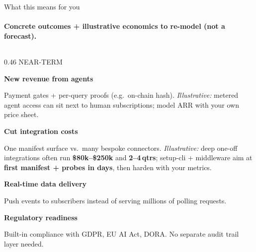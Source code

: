 \documentclass[aspectratio=169,10pt]{beamer}
\begin{document}
\begin{frame}[shrink=8]{What this means for you}
\framesubtitle{Concrete outcomes + \textbf{illustrative} economics to re-model (not a forecast).}

\vspace{0.06cm}

\begin{columns}[T]
\begin{column}{0.46\textwidth}
{\footnotesize\color{mint} NEAR-TERM}\par
\vspace{4pt}
{\footnotesize\color{txtm}%
\textbf{New revenue from agents}\par
{\color{slate} Payment gates + per-query proofs (e.g.\ on-chain hash). \textit{Illustrative:} metered agent access can sit next to human subscriptions; model ARR with your own price sheet.}\par
\vspace{6pt}
\textbf{Cut integration costs}\par
{\color{slate} One manifest surface vs.\ many bespoke connectors. \textit{Illustrative:} deep one-off integrations often run \textbf{\$80k--\$250k} and \textbf{2--4\,qtrs}; setup-cli + middleware aim at \textbf{first manifest + probes in days}, then harden with your metrics.}\par
\vspace{8pt}
\textbf{Real-time data delivery}\par
{\color{slate} Push events to subscribers instead of serving millions of polling requests.}\par
\vspace{10pt}
\textbf{Regulatory readiness}\par
{\color{slate} Built-in compliance with GDPR, EU AI Act, DORA. No separate audit trail layer needed.}%
}
\end{column}


\end{columns}
\end{frame}
\end{document}
